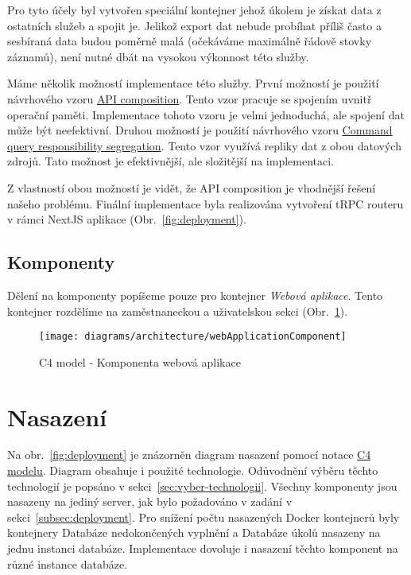 Pro tyto účely byl vytvořen speciální kontejner jehož úkolem je získat data z ostatních služeb a spojit je.
Jelikož export dat nebude probíhat příliš často a sesbíraná data budou poměrně malá (očekáváme maximálně řádově stovky záznamů), není nutné dbát na vysokou výkonnost této služby.

Máme několik možností implementace této služby.
První možností je použití návrhového vzoru \href{https://microservices.io/patterns/data/api-composition.html}{API composition}.
Tento vzor pracuje se spojením uvnitř operační paměti.
Implementace tohoto vzoru je velmi jednoduchá, ale spojení dat může být neefektivní.
Druhou možností je použití návrhového vzoru \href{https://microservices.io/patterns/data/cqrs.html}{Command query responsibility segregation}.
Tento vzor využívá repliky dat z obou datových zdrojů.
Tato možnost je efektivnější, ale složitější na implementaci.

Z vlastností obou možností je vidět, že API composition je vhodnější řešení našeho problému.
Finální implementace byla realizována vytvoření tRPC routeru v rámci NextJS aplikace (Obr.~\ref{fig:deployment}).

\subsection{Komponenty}\label{subsec:komponenty}

Dělení na komponenty popíšeme pouze pro kontejner \textit{Webová aplikace}.
Tento kontejner rozdělíme na zaměstnaneckou a uživatelskou sekci (Obr.~\ref{fig:architecture-component-web-application}).

\begin{figure}[H]
    \centering
    \texttt{[image: diagrams/architecture/webApplicationComponent]}
    \caption{C4 model - Komponenta webová aplikace}\label{fig:architecture-component-web-application}
\end{figure}


\section{Nasazení}\label{sec:deployment}

Na obr.~\ref{fig:deployment} je znázorněn diagram nasazení pomocí notace \href{https://c4model.com/#DeploymentDiagram}{C4 modelu}.
Diagram obsahuje i použité technologie.
Odůvodnění výběru těchto technologií je popsáno v sekci~\ref{sec:vyber-technologii}.
Všechny komponenty jsou nasazeny na jediný server, jak bylo požadováno v zadání v sekci~\ref{subsec:deployment}.
Pro snížení počtu nasazených Docker kontejnerů byly kontejnery Databáze nedokončených vyplnění a Databáze úkolů nasazeny na jednu instanci databáze.
Implementace dovoluje i nasazení těchto komponent na různé instance databáze.


